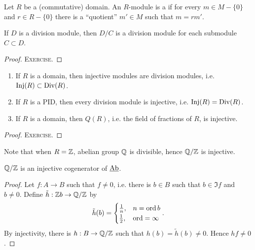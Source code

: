 \begin{definition*}
	Let \( R \) be a (commutative) domain. An \( R \)-module is a  if for every \( m \in M \minus \{0\} \) and \( r \in R \minus \{0\} \) there is a \enquote{quotient} \( m' \in M \) such that \( m = rm' \).
\end{definition*}

\begin{proposition*}
	If \( D \) is a division module, then \( D/C \) is a division module for each submodule \( C \subset D \).
\end{proposition*}
\begin{proof}
	\textsc{Exercise}.
\end{proof}

\newpage

\begin{proposition*}
	\hfill
	\begin{enumerate}
		\item If \( R \) is a domain, then injective modules are division modules, i.e.\( \mathrm{Inj}(R) \subset \mathrm{Div}(R) \).
		\item If \( R \) is a PID, then every division module is injective, i.e. \( \mathrm{Inj}(R) = \mathrm{Div}(R) \).
		\item If \( R \) is a domain, then \( Q(R) \), i.e. the field of fractions of \( R \), is injective.
	\end{enumerate}
\end{proposition*}
\begin{proof}
	\textsc{Exercise}.
\end{proof}

Note that when \( R = \mathbb{Z} \), abelian group \( \mathbb{Q} \) is divisible, hence \( \mathbb{Q}/\mathbb{Z} \) is injective.

\begin{proposition*}
	\( \mathbb{Q}/\mathbb{Z} \) is an injective cogenerator of \( \underline{\mathrm{Ab}} \).
\end{proposition*}
\begin{proof}
	Let \( f: A \to B \) such that \( f \neq 0 \), i.e. there is \( b \in B \) such that \( b \in \Im f \) and \( b \neq 0 \). Define \( \tilde{h}: \mathbb{Z}b \to \mathbb{Q}/\mathbb{Z} \) by
	\[\tilde{h}(b) =
		\begin{cases}
			\frac{1}{n}, & n = \operatorname{ord} b    \\
			\frac{1}{2}, & \operatorname{ord} = \infty
		\end{cases}
		.\]
	By injectivity, there is \( h: B \to \mathbb{Q}/\mathbb{Z} \) such that \( h(b) = \tilde{h}(b) \neq 0 \). Hence \( hf \neq 0 \).
\end{proof}

